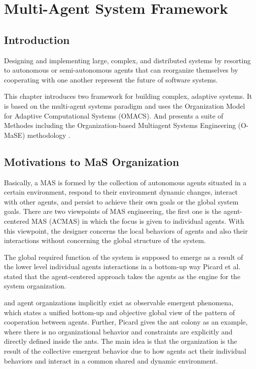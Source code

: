 
\chapter{\label{cha:org}Multi-Agent System Framework}


\section{Introduction}
Designing and implementing large, complex, and distributed systems by resorting to autonomous 
or semi-autonomous agents that can reorganize themselves by cooperating with one another 
represent the future of software systems\cite{omacs0}. 

This chapter introduces two framework for building complex, adaptive systems. 
It is based on the multi-agent systems paradigm and uses the Organization Model for Adaptive 
Computational Systems (OMACS). 
And presents a suite of Methodes including the Organization-based Multiagent Systems Engineering 
(O-MaSE) methodology \cite{omacs4}.


\section{Motivations to MaS Organization}
 
Basically, a MAS is formed by the collection of autonomous agents situated in a certain environment, respond
to their environment dynamic changes, interact with other agents, and persist to achieve their own goals or the global
system goals. There are two viewpoints of MAS engineering, the first one is the agent-centered MAS (ACMAS) in which
the focus is given to individual agents. With this viewpoint, the designer concerns the local behaviors of agents and also
their interactions without concerning the global structure of the system\cite{omacs3}.

The global required function of the system is supposed to emerge as a result of the lower level individual
agents interactions in a bottom-up way Picard et al. stated that the agent-centered approach takes the agents as the engine for the system organization\cite{omacs3}.

and agent organizations implicitly exist as observable emergent phenomena, which states a unified bottom-up and
objective global view of the pattern of cooperation between agents. Further, Picard gives the ant colony as an example, where there is no organizational behavior and constraints are explicitly and directly defined inside the ants. The main idea is that the organization is the result of the collective emergent
behavior due to how agents act their individual behaviors and interact in a common shared and dynamic environment\cite{omacs3}.

